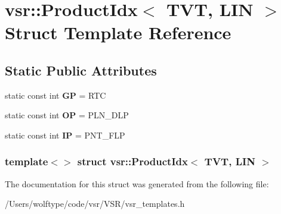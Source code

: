 \hypertarget{structvsr_1_1_product_idx_3_01_t_v_t_00_01_l_i_n_01_4}{\section{vsr\-:\-:Product\-Idx$<$ T\-V\-T, L\-I\-N $>$ Struct Template Reference}
\label{structvsr_1_1_product_idx_3_01_t_v_t_00_01_l_i_n_01_4}
}
\subsection*{Static Public Attributes}
\begin{DoxyCompactItemize}
\item 
\hypertarget{structvsr_1_1_product_idx_3_01_t_v_t_00_01_l_i_n_01_4_a9a86146d2b908dda7b43e8618c118310}{static const int {\bfseries G\-P} = R\-T\-C}\label{structvsr_1_1_product_idx_3_01_t_v_t_00_01_l_i_n_01_4_a9a86146d2b908dda7b43e8618c118310}

\item 
\hypertarget{structvsr_1_1_product_idx_3_01_t_v_t_00_01_l_i_n_01_4_a5aa0fd8c60bb16e5ca730715b642488a}{static const int {\bfseries O\-P} = P\-L\-N\-\_\-\-D\-L\-P}\label{structvsr_1_1_product_idx_3_01_t_v_t_00_01_l_i_n_01_4_a5aa0fd8c60bb16e5ca730715b642488a}

\item 
\hypertarget{structvsr_1_1_product_idx_3_01_t_v_t_00_01_l_i_n_01_4_ab3bf067f83363199bca6ef391332d5fe}{static const int {\bfseries I\-P} = P\-N\-T\-\_\-\-F\-L\-P}\label{structvsr_1_1_product_idx_3_01_t_v_t_00_01_l_i_n_01_4_ab3bf067f83363199bca6ef391332d5fe}

\end{DoxyCompactItemize}
\subsubsection*{template$<$$>$ struct vsr\-::\-Product\-Idx$<$ T\-V\-T, L\-I\-N $>$}



The documentation for this struct was generated from the following file\-:\begin{DoxyCompactItemize}
\item 
/\-Users/wolftype/code/vsr/\-V\-S\-R/vsr\-\_\-templates.\-h\end{DoxyCompactItemize}
